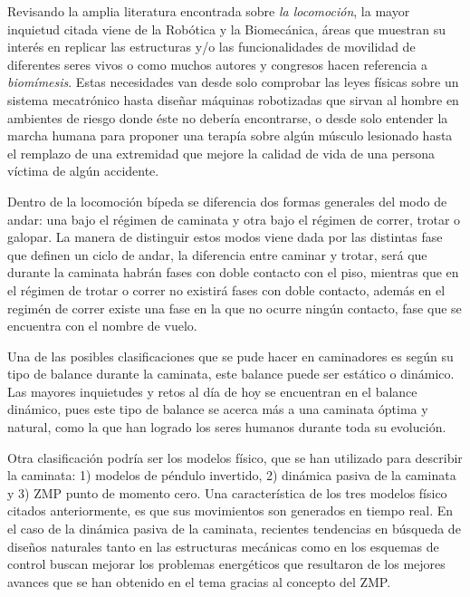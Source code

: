 Revisando la amplia literatura encontrada sobre \emph{la locomoci\'on}, la mayor inquietud citada viene de la Rob\'otica\cite{Xiang2010,Mattar2013} y la Biomec\'anica\cite{Xiang2010,Mattar2013}, \'areas que muestran su interés en replicar las estructuras y/o las funcionalidades de movilidad de diferentes seres vivos\cite{Xu2013,Chiang2013} o como muchos autores\cite{Xu2013} y congresos\cite{RB2009} hacen referencia a \emph{biom\'imesis}. Estas necesidades van desde solo comprobar las leyes f\'isicas sobre un sistema mecatr\'onico\cite{Barker2010,Lens2011} hasta dise\~nar m\'aquinas robotizadas que sirvan al hombre en ambientes de riesgo donde \'este no deber\'ia encontrarse\cite{Seifried2014,Wu2013a}, o desde solo entender la marcha humana para proponer una terap\'ia sobre alg\'un m\'usculo lesionado\cite{Kang2013} hasta el remplazo de una extremidad que mejore la calidad de vida de una persona v\'ictima de alg\'un accidente\cite{Roa2006,Wu2013a}.\par
Dentro de la locomoci\'on b\'ipeda se diferencia dos formas generales del modo de andar: una bajo el r\'egimen de caminata y otra bajo el r\'egimen de correr, trotar o galopar\cite{Geyer2006}. La manera de distinguir estos modos viene dada por las distintas fase que definen un ciclo de andar, la diferencia entre caminar y trotar, ser\'a que durante la caminata habr\'an fases con doble contacto con el piso, mientras que en el r\'egimen de trotar o correr no existirá fases con doble contacto\cite{Geyer2006}, adem\'as en el regim\'en de correr existe una fase en la que no ocurre ningún contacto, fase que se encuentra con el nombre de vuelo.\par
Una de las posibles clasificaciones que se pude hacer en caminadores es seg\'un su tipo de balance durante la caminata, este balance puede ser est\'atico o din\'amico\cite{Braunl2008}. Las mayores inquietudes y retos al d\'ia de hoy se encuentran en el balance din\'amico, pues este tipo de balance se acerca m\'as a una caminata \'optima y natural, como la que han logrado los seres humanos durante toda su evoluci\'on.\par
Otra clasificaci\'on podr\'ia ser los modelos físico, que se han utilizado para describir la caminata\cite{Xiang2010}: 1) modelos de p\'endulo invertido, 2) din\'amica pasiva de la caminata y 3) ZMP punto de momento cero. Una caracter\'istica de los tres modelos f\'isico citados anteriormente, es que sus movimientos son generados en tiempo real\cite{Xiang2010}. En el caso de la din\'amica pasiva de la caminata, recientes tendencias en b\'usqueda de dise\~nos naturales tanto en las estructuras mec\'anicas como en los esquemas de control buscan mejorar los problemas energ\'eticos que resultaron de los mejores avances que se han obtenido en el tema gracias al concepto del ZMP\cite{Xiang2010}.\par
